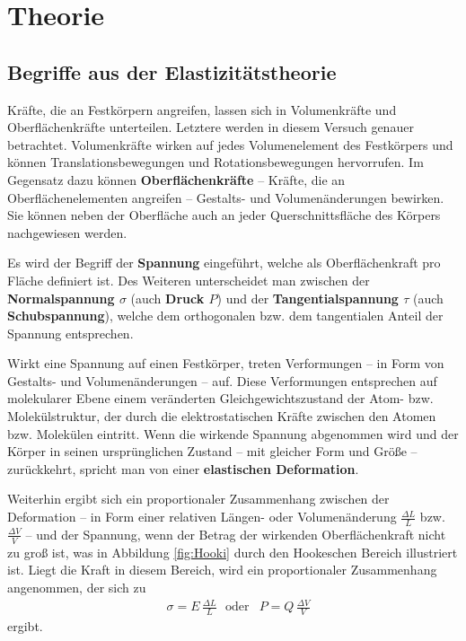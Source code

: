 \section{Theorie}
\label{sec:Theorie}

\subsection{Begriffe aus der Elastizitätstheorie}
\label{sec:begriffe}

Kräfte, die an Festkörpern angreifen, lassen sich in Volumenkräfte und Oberflächenkräfte 
unterteilen. Letztere werden in diesem Versuch genauer betrachtet. 
Volumenkräfte wirken auf jedes Volumenelement des Festkörpers und können Translationsbewegungen 
und Rotationsbewegungen hervorrufen.
Im Gegensatz dazu können \textbf{Oberflächenkräfte} -- Kräfte, die an Oberflächenelementen
angreifen -- Gestalts- und Volumenänderungen bewirken. Sie können neben der Oberfläche auch an 
jeder Querschnittsfläche des Körpers nachgewiesen werden.

Es wird der Begriff der \textbf{Spannung} eingeführt, welche als Oberflächenkraft pro Fläche
definiert ist. Des Weiteren unterscheidet man zwischen der \textbf{Normalspannung $\sigma$}
(auch \textbf{Druck $P$}) und der \textbf{Tangentialspannung $\tau$} (auch
\textbf{Schubspannung}), welche dem orthogonalen bzw. dem tangentialen Anteil der Spannung
entsprechen. 

Wirkt eine Spannung auf einen Festkörper, treten Verformungen -- in Form von Gestalts- und 
Volumenänderungen -- auf. Diese Verformungen entsprechen auf molekularer Ebene einem veränderten 
Gleichgewichtszustand der Atom- bzw. Molekülstruktur, der durch die elektrostatischen 
Kräfte zwischen den Atomen bzw. Molekülen eintritt. Wenn die wirkende Spannung abgenommen wird
und der Körper in seinen ursprünglichen Zustand -- mit gleicher Form und Größe -- zurückkehrt,
spricht man von einer \textbf{elastischen Deformation}.

Weiterhin ergibt sich ein proportionaler Zusammenhang zwischen der Deformation -- in Form 
einer relativen Längen- oder Volumenänderung $\frac{\Delta L}{L}$ bzw.
$\frac{\Delta V}{V}$ -- und der Spannung, wenn der Betrag der wirkenden Oberflächenkraft nicht 
zu groß ist, was in Abbildung \ref{fig:Hooki} durch den Hookeschen Bereich illustriert ist.
Liegt die Kraft in diesem Bereich, wird ein proportionaler Zusammenhang angenommen, der sich zu
\begin{align}
	\label{eqn:elastimodi}
	&\sigma = E \, \frac{\Delta L}{L} \,\,\,\, \mathrm{oder}  &P = Q \, \frac{\Delta V}{V}
\end{align}
ergibt.

